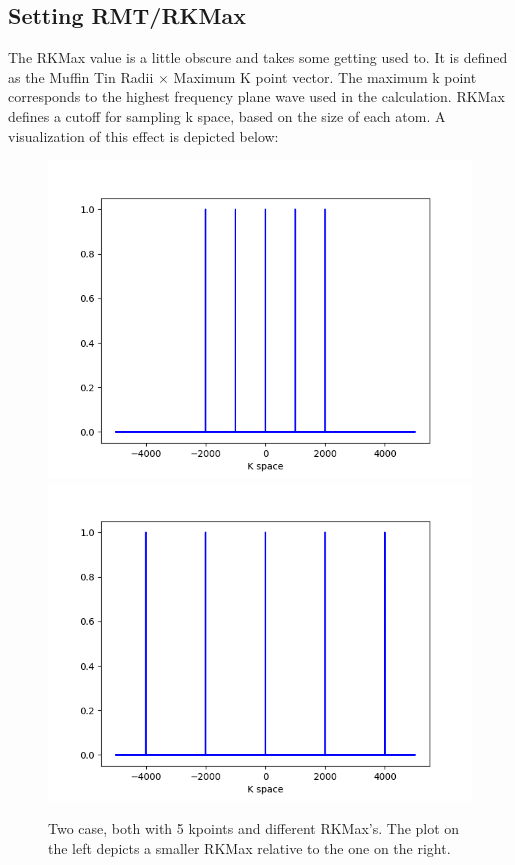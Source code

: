 \documentclass[12pt]{article}
\begin{document}
\subsection{Setting RMT/RKMax}
The RKMax value is a little obscure and takes some getting used to.   It is defined as the Muffin Tin Radii $\times$ Maximum K point vector.   The maximum k point corresponds to the highest frequency plane wave used in the calculation. RKMax defines a cutoff for sampling  k space, based on the size of each atom.  A visualization of this effect is depicted below:

\begin{figure}[H]
	\includegraphics[scale=0.5]{./images/low_rkmax.png}
	\includegraphics[scale=0.5]{./images/high_rkmax.png}	\caption*{Two case, both with 5 kpoints and different RKMax's.  The plot on the left depicts a smaller RKMax relative to the one on the right.}
\end{figure}
\end{document}
